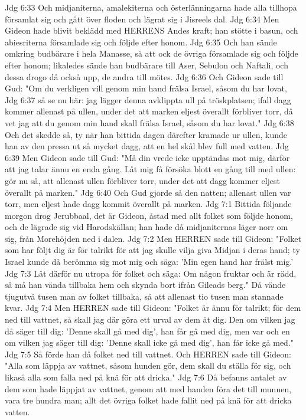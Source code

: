 Jdg 6:33  Och midjaniterna, amalekiterna och österlänningarna hade alla tillhopa församlat sig och gått över floden och lägrat sig i Jisreels dal.
Jdg 6:34  Men Gideon hade blivit beklädd med HERRENS Andes kraft; han stötte i basun, och abiesriterna församlade sig och följde efter honom.
Jdg 6:35  Och han sände omkring budbärare i hela Manasse, så att ock de övriga församlade sig och följde efter honom; likaledes sände han budbärare till Aser, Sebulon och Naftali, och dessa drogo då också upp, de andra till mötes.
Jdg 6:36  Och Gideon sade till Gud: "Om du verkligen vill genom min hand frälsa Israel, såsom du har lovat,
Jdg 6:37  så se nu här: jag lägger denna avklippta ull på tröskplatsen; ifall dagg kommer allenast på ullen, under det att marken eljest överallt förbliver torr, då vet jag att du genom min hand skall frälsa Israel, såsom du har lovat."
Jdg 6:38  Och det skedde så, ty när han bittida dagen därefter kramade ur ullen, kunde han av den pressa ut så mycket dagg, att en hel skål blev full med vatten.
Jdg 6:39  Men Gideon sade till Gud: "Må din vrede icke upptändas mot mig, därför att jag talar ännu en enda gång. Låt mig få försöka blott en gång till med ullen: gör nu så, att allenast ullen förbliver torr, under det att dagg kommer eljest överallt på marken."
Jdg 6:40  Och Gud gjorde så den natten; allenast ullen var torr, men eljest hade dagg kommit överallt på marken.
Jdg 7:1  Bittida följande morgon drog Jerubbaal, det är Gideon, åstad med allt folket som följde honom, och de lägrade sig vid Harodskällan; han hade då midjaniternas läger norr om sig, från Morehöjden ned i dalen.
Jdg 7:2  Men HERREN sade till Gideon: "Folket som har följt dig är för talrikt för att jag skulle vilja giva Midjan i deras hand; ty Israel kunde då berömma sig mot mig och säga: 'Min egen hand har frälst mig.'
Jdg 7:3  Låt därför nu utropa för folket och säga: Om någon fruktar och är rädd, så må han vända tillbaka hem och skynda bort ifrån Gileads berg." Då vände tjugutvå tusen man av folket tillbaka, så att allenast tio tusen man stannade kvar.
Jdg 7:4  Men HERREN sade till Gideon: "Folket är ännu för talrikt; för dem ned till vattnet, så skall jag där göra ett urval av dem åt dig. Den om vilken jag då säger till dig: 'Denne skall gå med dig', han får gå med dig, men var och en om vilken jag säger till dig: 'Denne skall icke gå med dig', han får icke gå med."
Jdg 7:5  Så förde han då folket ned till vattnet. Och HERREN sade till Gideon: "Alla som läppja av vattnet, såsom hunden gör, dem skall du ställa för sig, och likaså alla som falla ned på knä för att dricka."
Jdg 7:6  Då befanns antalet av dem som hade läppjat av vattnet, genom att med handen föra det till munnen, vara tre hundra man; allt det övriga folket hade fallit ned på knä för att dricka vatten.
